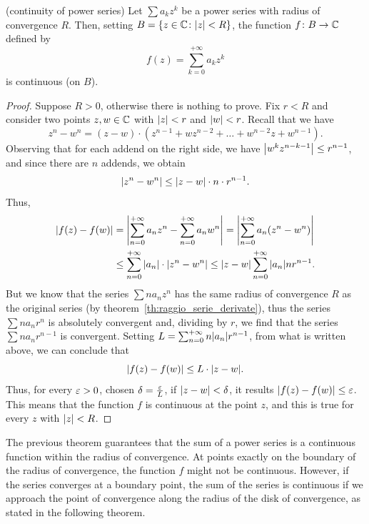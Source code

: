 \begin{theorem}(continuity of power series)
\label{th:continuita_somma_serie}%
%
%
Let $\sum a_k z^k$ be a power series with radius of convergence $R$.
Then, setting $B={\left\{ z\in {\mathbb C}\colon {\left|z\right|}<R \right\}}$, the function $f\colon B
\to {\mathbb C}$
defined by
\[
 f(z) = \sum_{k=0}^{+\infty} a_k z^k
\]
is continuous (on $B$).
\end{theorem}
%
\begin{proof}
Suppose $R>0$, otherwise there is nothing to prove.
Fix $r<R$ and consider two points $z,w\in {\mathbb C}$ 
with ${\left|z\right|}<r$ and ${\left|w\right|}<r$.
Recall that we have 
\[
  z^n - w^n = (z-w)\cdot(z^{n-1} + wz^{n-2} + \dots + w^{n-2}z + w^{n-1}).
\]
Observing that for each addend on the right side, we have 
${\left|w^k z^{n-k-1}\right|}\le r^{n-1}$, and since there are $n$ addends, we obtain 
\[
  {\left|z^n - w^n\right|} \le {\left|z-w\right|}\cdot n\cdot  r^{n-1}.
\]
Thus, 
\begin{align*}
  {\left|f(z)-f(w)\right|} 
  &= {\left|\sum_{n=0}^{+\infty} a_n z^n - \sum_{n=0}^{+\infty} a_n w^n\right|}
   = {\left|\sum_{n=0}^{+\infty} a_n (z^n - w^n)\right|} \\
& \le \sum_{n=0}^{+\infty} {\left|a_n\right|} \cdot {\left|z^n - w^n\right|}
\le {\left|z-w\right|}\sum_{n=0}^{+\infty} {\left|a_n\right|} n r^{n-1}.
\end{align*}
But we know that the series $\sum n a_n z^n$ 
has the same radius of convergence $R$ as the original series 
(by theorem~\ref{th:raggio_serie_derivate}),
thus the series $\sum n a_n r^n$ is absolutely convergent and, 
dividing by $r$, 
we find that the series $\sum n a_n r^{n-1}$
is convergent. 
Setting $L = \sum_{n=0}^{+\infty} n {\left|a_n\right|} r^{n-1}$,
from what is written above, we can conclude that 
\[
{\left|f(z)-f(w)\right|} \le L\cdot {\left|z-w\right|}.
\]
Thus, for every $\varepsilon>0$, chosen $\delta = \frac{\varepsilon}{L}$,
if ${\left|z-w\right|}<\delta$, it results ${\left|f(z)-f(w)\right|}\le \varepsilon$.
This means that the function $f$ is continuous at the point $z$, and 
this is true for every $z$ with ${\left|z\right|}<R$.
\end{proof}

The previous theorem guarantees that the sum of a power series
is a continuous function within the radius of convergence.
At points exactly on the boundary of the radius of convergence,
the function $f$ might not be continuous.
However, if the series converges at a
boundary point, the sum of the series is continuous if we approach the point of
convergence along the radius of the disk of convergence, as stated in the
following theorem.

